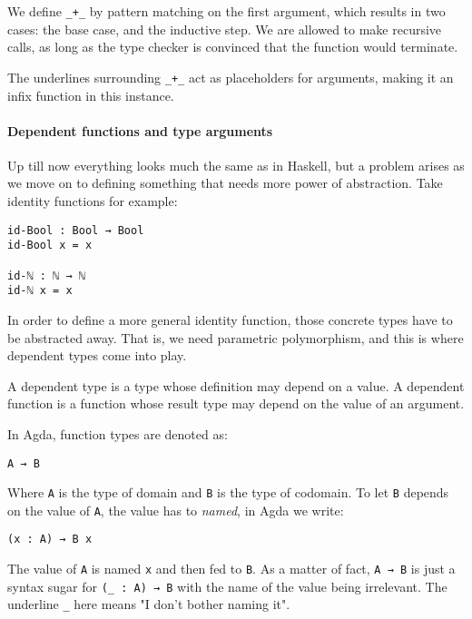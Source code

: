 \documentclass[12pt, a4paper]{article}
\begin{document}
We define {\lstinline|_+_|} by pattern matching on the first argument, which results
in two cases: the base case, and the inductive step. We are allowed to make
recursive calls, as long as the type checker is convinced that the function
would terminate.

The underlines surrounding {\lstinline|_+_|} act as placeholders for arguments, making
it an infix function in this instance.

\paragraph{Dependent functions and type arguments}
Up till now everything looks much the same as in Haskell, but a problem arises as
we move on to defining something that needs more power of abstraction. Take identity
functions for example:

\begin{lstlisting}
id-Bool : Bool → Bool
id-Bool x = x

id-ℕ : ℕ → ℕ
id-ℕ x = x
\end{lstlisting}

In order to define a more general identity function, those concrete types have
to be abstracted away. That is, we need parametric polymorphism, and this is
where dependent types come into play.

A dependent type is a type whose definition may depend on a value. A dependent
function is a function whose result type may depend on the value of an argument.

In Agda, function types are denoted as:

\begin{lstlisting}
A → B
\end{lstlisting}

Where {\lstinline|A|} is the type of domain and {\lstinline|B|} is the type of
codomain. To let {\lstinline|B|} depends on the value of {\lstinline|A|}, the
value has to \textit{named}, in Agda we write:

\begin{lstlisting}
(x : A) → B x
\end{lstlisting}

The value of {\lstinline|A|} is named {\lstinline|x|} and then fed to {\lstinline|B|}.
As a matter of fact, {\lstinline|A → B|} is just a syntax sugar for {\lstinline|(_ : A) → B|}
with the name of the value being irrelevant. The underline {\lstinline|_|} here
means "I don't bother naming it".
\end{document}
